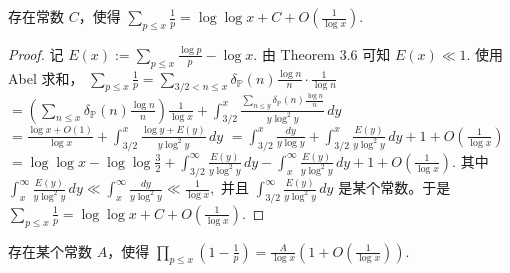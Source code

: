 \begin{theorem}[原文 Theorem 3.7]
	存在常数 $C$，使得
	\(\textstyle \sum_{p\leq\allowbreak{} x}\frac1p =\allowbreak{} \log\log x+\allowbreak{}C+\allowbreak{}O\left(\frac1{\log x}\right).\)
\end{theorem}

\begin{proof}
	记
	\(\textstyle E(x):=\allowbreak{}\sum_{p\leq\allowbreak{} x}\frac{\log p}{p}-\log x.\)
	由 Theorem 3.6 可知
	\(\textstyle E(x)\ll\allowbreak{} 1.\)
	使用 Abel 求和，
	\(\textstyle \sum_{p\leq\allowbreak{} x}\frac1p =\allowbreak{} \sum_{3/2<n\leq\allowbreak{} x} \delta_{\mathbb P}(n)\frac{\log n}{n}\cdot\frac1{\log n}\) \(\textstyle =\allowbreak{} \left(\sum_{n\leq\allowbreak{} x}\delta_{\mathbb P}(n)\frac{\log n}{n}\right)\frac1{\log x} +\allowbreak{} \int_{3/2}^x \frac{\sum_{n\leq\allowbreak{} y}\delta_{\mathbb P}(n)\frac{\log n}{n}}{y\log^2 y}\,dy\) \(\textstyle =\allowbreak{} \frac{\log x+\allowbreak{}O(1)}{\log x} +\allowbreak{} \int_{3/2}^x\frac{\log y+\allowbreak{}E(y)}{y\log^2 y}\,dy\) \(\textstyle =\allowbreak{} \int_{3/2}^x\frac{dy}{y\log y} +\allowbreak{} \int_{3/2}^x\frac{E(y)}{y\log^2 y}\,dy +\allowbreak{} 1+\allowbreak{}O\left(\frac1{\log x}\right)\) \(\textstyle =\allowbreak{} \log\log x-\log\log\frac32 +\allowbreak{} \int_{3/2}^{\infty}\frac{E(y)}{y\log^2 y}\,dy - \int_x^\infty\frac{E(y)}{y\log^2 y}\,dy +\allowbreak{} 1+\allowbreak{}O\left(\frac1{\log x}\right).\)
	其中
	\(\textstyle \int_x^\infty\frac{E(y)}{y\log^2 y}\,dy \ll\allowbreak{} \int_x^\infty\frac{dy}{y\log^2 y} \ll\allowbreak{} \frac1{\log x},\allowbreak{}\)
	并且
	\(\textstyle \int_{3/2}^{\infty}\frac{E(y)}{y\log^2 y}\,dy\)
	是某个常数。于是
	\(\textstyle \sum_{p\leq\allowbreak{} x}\frac1p =\allowbreak{} \log\log x+\allowbreak{}C+\allowbreak{}O\left(\frac1{\log x}\right).\)
\end{proof}

\begin{theorem}[原文 Theorem 3.8]
	存在某个常数 $A$，使得
	\(\textstyle \prod_{p\leq\allowbreak{} x}\left(1-\frac1p\right) =\allowbreak{} \frac{A}{\log x} \left(1+\allowbreak{}O\left(\frac1{\log x}\right)\right).\)
\end{theorem}

